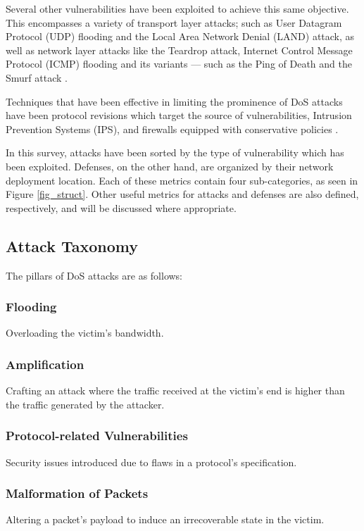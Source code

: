 \documentclass[conference]{IEEEtran}
\begin{document}
Several other vulnerabilities have been exploited to achieve this same objective. This encompasses a variety of transport layer attacks; such as User Datagram Protocol (UDP) flooding and the Local Area Network Denial (LAND) attack, as well as network layer attacks like the Teardrop attack, Internet Control Message Protocol (ICMP) flooding and its variants --- such as the Ping of Death and the Smurf attack \cite{SecuringCloudServers:Chapade,Yan:SDNSurvey}.

Techniques that have been effective in limiting the prominence of DoS attacks have been protocol revisions which target the source of vulnerabilities, Intrusion Prevention Systems (IPS), and firewalls equipped with conservative policies \cite{DoSTCPAnalysis:Schuba}.

In this survey, attacks have been sorted by the type of vulnerability which has been exploited. Defenses, on the other hand, are organized by their network deployment location. Each of these metrics contain four sub-categories, as seen in Figure \ref{fig_struct}. Other useful metrics for attacks and defenses are also defined, respectively, and will be discussed where appropriate.

\subsection{Attack Taxonomy}
The pillars of DoS attacks are as follows: 
\subsubsection{Flooding}
Overloading the victim's bandwidth.
\subsubsection{Amplification}
Crafting an attack where the traffic received at the victim's end is higher than the traffic generated by the attacker.
\subsubsection{Protocol-related Vulnerabilities}
Security issues introduced due to flaws in a protocol's specification.
\subsubsection{Malformation of Packets}
Altering a packet's payload to induce an irrecoverable state in the victim.
\end{document}
